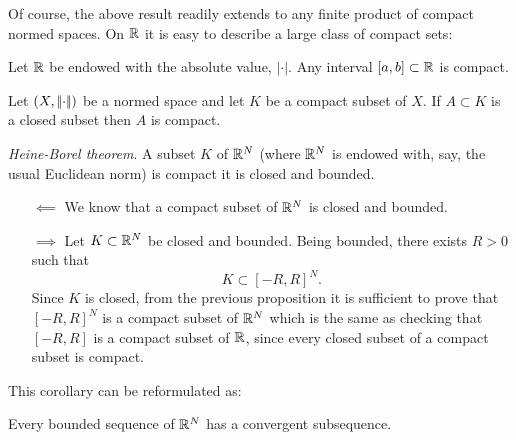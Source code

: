 \documentclass{article}
\begin{document}
Of course, the above result readily extends to any finite product of compact normed spaces. On $\mathbb{R}$ it is easy to describe a large class of compact sets:
\begin{lemma}
	Let $\mathbb{R}$ be endowed with the absolute value, $|\cdot|$. Any interval $[a,b]\subset\mathbb{R}$ is compact.
\end{lemma}
\begin{proposition}
	Let $(X,\left|\negthinspace\left|\cdot\right|\negthinspace\right|)$ be a normed space and let $K$ be a compact subset of $X$. If $A\subset K$ is a closed subset then $A$ is compact.
\end{proposition}
\begin{corollary}
	\emph{Heine-Borel theorem}. A subset $K$ of $\mathbb{R}^{N}$ (where $\mathbb{R}^{N}$ is endowed with, say, the usual Euclidean norm) is compact \ifonly{} it is closed and bounded.
\end{corollary}
\begin{fancyproof}
	\begin{enumerate}
		\item[$\impliedby$] We know that a compact subset of $\mathbb{R}^{N}$ is closed and bounded.
		\item[$\implies$] Let $K\subset\mathbb{R}^{N}$ be closed and bounded. Being bounded, there exists $R>0$ such that
		\begin{equation*}
			K\subset[-R,R]^{N}.
		\end{equation*}
		Since $K$ is closed, from the previous proposition it is sufficient to prove that $[-R,R]^{N}$ is a compact subset of $\mathbb{R}^{N}$ which is the same as checking that $[-R,R]$ is a compact subset of $\mathbb{R}$, since every closed subset of a compact subset is compact.
	\end{enumerate}
\end{fancyproof}
This corollary can be reformulated as:
\begin{center}
	Every bounded sequence of $\mathbb{R}^{N}$ has a convergent subsequence.
\end{center}
\end{document}
